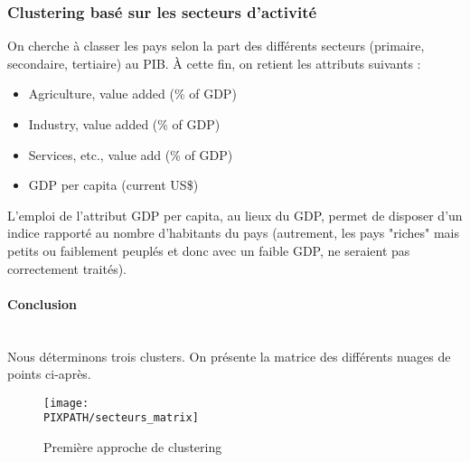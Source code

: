 \subsubsection{Clustering basé sur les secteurs d'activité}

On cherche à classer les pays selon la part des différents secteurs
(primaire, secondaire, tertiaire) au PIB. À cette fin, on retient les
attributs suivants :
\begin{itemize}
\item Agriculture, value added (\% of GDP)
\item Industry, value added (\% of GDP)
\item Services, etc., value add (\% of GDP)
\item GDP per capita (current US\$)
\end{itemize}

\vskip 6pt

L'emploi de l'attribut GDP per capita, au lieux du GDP, permet de disposer
d'un indice rapporté au nombre d'habitants du pays (autrement, les pays
"riches" mais petits ou faiblement peuplés et donc avec un faible GDP, ne
seraient pas correctement traités).

\paragraph{Conclusion}\hfill\\

Nous déterminons trois clusters. On présente la matrice des différents
nuages de points ci-après.

\begin{sidewaysfigure}[h]
\centering
\caption{Première approche de clustering}
\texttt{[image: \\PIXPATH/secteurs\_matrix]}
\end{sidewaysfigure}

